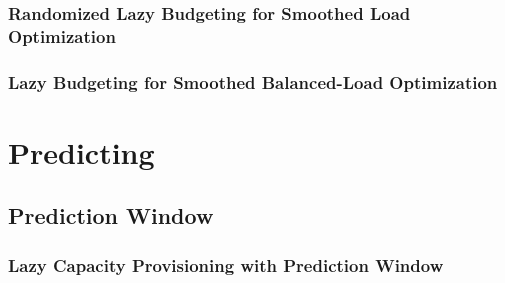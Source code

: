 \subsubsection{Randomized Lazy Budgeting for Smoothed Load Optimization}

\subsubsection{Lazy Budgeting for Smoothed Balanced-Load Optimization}

\section{Predicting}

\subsection{Prediction Window}

\subsubsection{Lazy Capacity Provisioning with Prediction Window}
